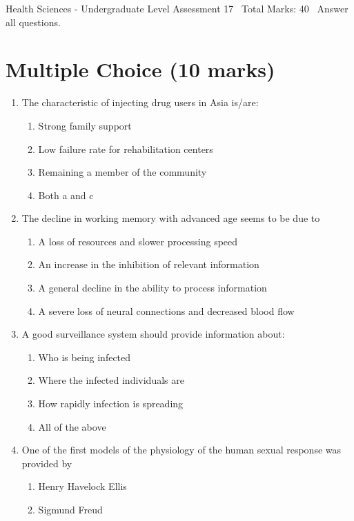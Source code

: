 \documentclass[12pt]{article}
\begin{document}
\begin{center}
Health Sciences - Undergraduate Level Assessment 17 \
Total Marks: 40 \
Answer all questions.
\end{center}

\section*{Multiple Choice (10 marks)}
\begin{enumerate}[label=\arabic*.]
\item The characteristic of injecting drug users in Asia is/are:
\begin{enumerate}[label=(\alph*)]
    \item Strong family support
    \item Low failure rate for rehabilitation centers
    \item Remaining a member of the community
    \item Both a and c
\end{enumerate}
\item The decline in working memory with advanced age seems to be due to
\begin{enumerate}[label=(\alph*)]
    \item A loss of resources and slower processing speed
    \item An increase in the inhibition of relevant information
    \item A general decline in the ability to process information
    \item A severe loss of neural connections and decreased blood flow
\end{enumerate}
\item A good surveillance system should provide information about:
\begin{enumerate}[label=(\alph*)]
    \item Who is being infected
    \item Where the infected individuals are
    \item How rapidly infection is spreading
    \item All of the above
\end{enumerate}
\item One of the first models of the physiology of the human sexual response was provided by
\begin{enumerate}[label=(\alph*)]
    \item Henry Havelock Ellis
    \item Sigmund Freud

\end{enumerate}
\end{enumerate}
\end{document}
